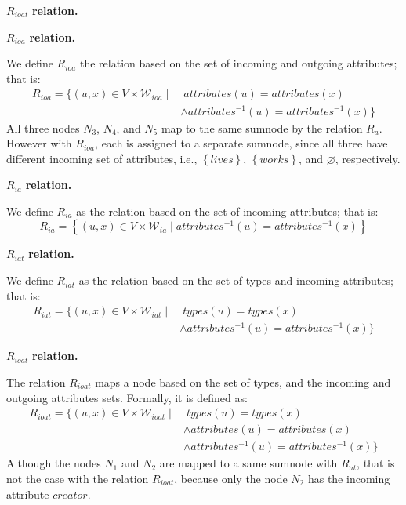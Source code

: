 \begin{labeling}{$R_{ioat}$ \textbf{relation.}}
\item[$R_{ioa}$ \textbf{relation.}]

We define $R_{ioa}$ the relation based on the set of incoming and outgoing attributes; that is:
$$
\begin{aligned}
R_{ioa} =
\{
(u, x) \in V \times \mathcal{W}_{ioa} \mid &\; attributes(u) = attributes(x) \\
& \wedge attributes^{-1}(u) = attributes^{-1}(x)
\}
\end{aligned}
$$
All three nodes $N_3$, $N_4$, and $N_5$ map to the same sumnode by the relation $R_a$. However with $R_{ioa}$, each is assigned to a separate sumnode, since all three have different incoming set of attributes, i.e., $\left\lbrace lives \right\rbrace$, $\left\lbrace works \right\rbrace$, and $\varnothing$, respectively.

\item[$R_{ia}$ \textbf{relation.}]

We define $R_{ia}$ as the relation based on the set of incoming attributes; that is:
\begin{equation*}
R_{ia} = \left\lbrace (u, x) \in V \times \mathcal{W}_{ia} \mid attributes^{-1}(u) = attributes^{-1}(x) \right\rbrace
\end{equation*}

\item[$R_{iat}$ \textbf{relation.}]

We define $R_{iat}$ as the relation based on the set of types and incoming attributes; that is:
$$
\begin{aligned}
R_{iat} = \{ (u, x) \in V \times \mathcal{W}_{iat} \mid &\; types(u) = types(x) \\
& \wedge attributes^{-1}(u) = attributes^{-1}(x) \}
\end{aligned}
$$

\item[$R_{ioat}$ \textbf{relation.}]

The relation $R_{ioat}$ maps a node based on the set of types, and the incoming and outgoing attributes sets. Formally, it is defined as:
$$
\begin{aligned}
R_{ioat} = \{ (u, x) \in V \times \mathcal{W}_{ioat} \mid &\; types(u) = types(x) \\
& \wedge attributes(u) = attributes(x) \\
& \wedge attributes^{-1}(u) = attributes^{-1}(x) \}
\end{aligned}
$$
Although the nodes $N_1$ and $N_2$ are mapped to a same sumnode with $R_{at}$, that is not the case with the relation $R_{ioat}$, because only the node $N_2$ has the incoming attribute $creator$.
\end{labeling}

